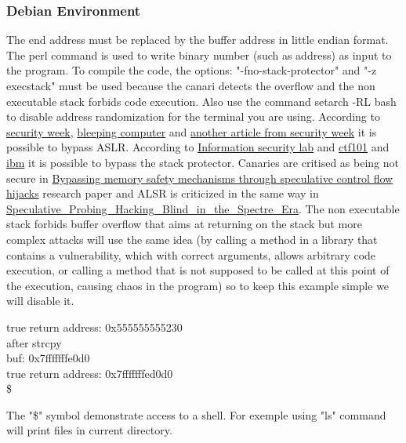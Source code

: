 \documentclass[a4paper, 11pt]{article}
\begin{document}
	\subsubsection{Debian Environment}
The end address must be replaced by the buffer address in little endian format.
The perl command is used to write binary number (such as address) as input to the program.
To compile the code, the options: "-fno-stack-protector" and "-z execstack" must be used because the canari detects the overflow and the non executable stack forbids code execution.
Also use the command setarch -RL bash to disable address randomization for the terminal you are using.
According to \href{https://www.securityweek.com/aslr-bypass-techniques-appearing-more-frequently-attacks/}{security week}, \href{https://www.bleepingcomputer.com/news/security/cisa-warns-of-samsung-aslr-bypass-flaw-exploited-in-attacks/}{bleeping computer} and \href{https://www.securityweek.com/aslr-bypass-techniques-appearing-more-frequently-attacks/}{another article from security week} it is possible to bypass ASLR.
According to \href{https://tc.gts3.org/cs6265/2020-spring/tut/tut04-ssp.html}{Information security lab} and \href{https://ctf101.org/binary-exploitation/stack-canaries/}{ctf101} and \href{https://ibm.github.io/system-security-research-updates/2021/06/18/spear-attacks-ssp-usecase}{ibm} it is possible to bypass the stack protector.
Canaries are critised as being not secure in \href{https://ar5iv.labs.arxiv.org/html/2003.05503}{Bypassing memory safety mechanisms through speculative control flow hijacks} research paper and ALSR is criticized in the same way in \href{https://www.researchgate.net/publication/346588673_Speculative_Probing_Hacking_Blind_in_the_Spectre_Era}{Speculative\_Probing\_Hacking\_Blind\_in\_the\_Spectre\_Era}.
The non executable stack forbids buffer overflow that aims at returning on the stack but more complex attacks will use the same idea (by calling a method in a library that contains a vulnerability, which with correct arguments, allows arbitrary code execution, or calling a method that is not supposed to be called at this point of the execution, causing chaos in the program) so to keep this example simple we will disable it.

\begin{tcolorbox}[colback=gray!5!white, colframe=gray!75!black, title=Output on classic \Gls{risc-v} environment (No CHERI protection)]
true return address: 0x555555555230\\
after strcpy\\
buf: 0x7fffffffe0d0\\
true return address: 0x7fffffffed0d0\\
\$ 
\end{tcolorbox}
The "\$" symbol demonstrate access to a shell. For exemple using "ls" command will print files in current directory.
\end{document}
